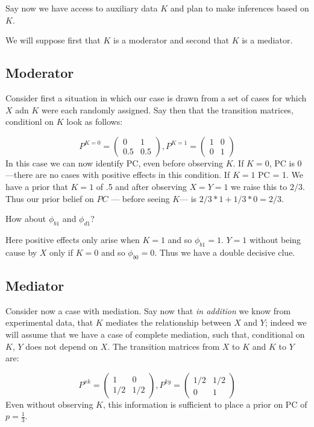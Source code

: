 \documentclass[12pt,]{book}
\begin{document}
Say now we have access to auxiliary data \(K\) and plan to make inferences based on \(K\).

We will suppose first that \(K\) is a moderator and second that \(K\) is a mediator.

\hypertarget{moderator}{%
\subsection{Moderator}\label{moderator}}

Consider first a situation in which our case is drawn from a set of cases for which \(X\) adn \(K\) were each randomly assigned. Say then that the transition matrices, conditionl on \(K\) look as follows:

\[P^{K=0}=\left( \begin{array}{cc} 0 & 1 \\ 0.5 & 0.5 \end{array}\right), P^{K=1}=\left( \begin{array}{cc} 1 & 0 \\ 0 & 1 \end{array}\right)\]
In this case we can now identify PC, even before observing \(K\). If \(K=0\), PC is 0---there are no cases with positive effects in this condition. If \(K=1\) PC = 1. We have a prior that \(K=1\) of .5 and after observing \(X=Y=1\) we raise this to \(2/3\). Thus our prior belief on \(PC\) --- before seeing \(K\)--- is \(2/3 * 1 + 1/3 * 0 = 2/3\).

How about \(\phi_{b1}\) and \(\phi_{d1}\)?

Here positive effects only arise when \(K=1\) and so \(\phi_{b1} = 1\). \(Y=1\) without being cause by \(X\) only if \(K=0\) and so \(\phi_{b0} = 0\). Thus we have a double decisive clue.

\hypertarget{mediator}{%
\subsection{Mediator}\label{mediator}}

Consider now a case with mediation. Say now that \emph{in addition} we know from experimental data, that \(K\) mediates the relationship between \(X\) and \(Y\); indeed we will assume that we have a case of complete mediation, such that, conditional on \(K\), \(Y\) does not depend on \(X\). The transition matrices from \(X\) to \(K\) and \(K\) to \(Y\) are:

\[P^{xk}=\left( \begin{array}{cc} 1 & 0 \\ 1/2 & 1/2\end{array}\right), P^{ky}=\left( \begin{array}{cc} 1/2 & 1/2 \\ 0 & 1\end{array}\right)\]
Even without observing \(K\), this information is sufficient to place a prior on PC of \(p=\frac13\).
\end{document}
